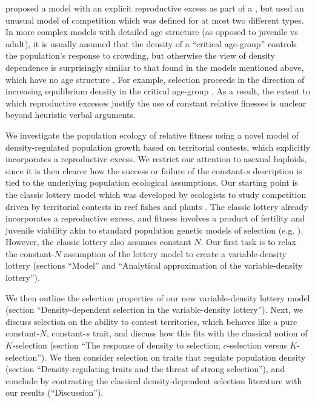 \documentclass[12pt]{article}
\begin{document}
\cite{nei1971fertility} proposed a model with an explicit reproductive excess as part of a , but used an unusual model of competition which was defined for at most two different types. In more complex models with detailed age structure (as opposed to juvenile vs adult), it is usually assumed that the density of a ``critical age-group'' controls the population's response to crowding, but otherwise the view of density dependence is surprisingly similar to that found in the models mentioned above, which have no age structure \citep[Chap. 4]{charlesworth_1994}. For example, selection proceeds in the direction of increasing equilibrium density in the critical age-group \citep[pp. 148]{charlesworth_1994}. As a result, the extent to which reproductive excesses justify the use of constant relative finesses is unclear beyond heuristic verbal arguments.

We investigate the population ecology of relative fitness using a novel model of density-regulated population growth based on territorial contests, which explicitly incorporates a reproductive excess. We restrict our attention to asexual haploids, since it is then clearer how the success or failure of the constant-$s$ description is tied to the underlying population ecological assumptions. Our starting point is the classic lottery model which was developed by ecologists to study competition driven by territorial contests in reef fishes and plants \citep{sale_77,chesson_1981}. The classic lottery already incorporates a reproductive excess, and fitness involves a product of fertility and juvenile viability akin to standard population genetic models of selection (e.g. \citealt[pp. 185]{crow_1970}). However, the classic lottery also assumes constant $N$. Our first task is to relax the constant-$N$ assumption of the lottery model to create a variable-density lottery (sections ``Model'' and ``Analytical approximation of the variable-density lottery''). 

We then outline the selection properties of our new variable-density lottery model (section ``Density-dependent selection in the variable-density lottery''). Next, we discuss
selection on the ability to contest territories, which behaves like a pure constant-$N$, constant-$s$ trait, and discuss how this fits with the classical notion of $K$-selection  (section ``The response of density to selection; $c$-selection versus $K$-selection''). We then consider selection on traits that regulate population density (section ``Density-regulating traits and the threat of strong selection''), and conclude by contrasting the classical density-dependent selection literature with our results (``Discussion'').
\end{document}
